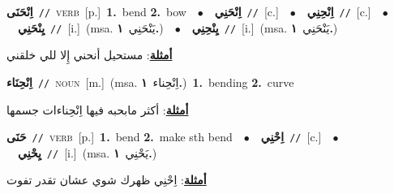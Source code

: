 \documentclass[10pt,a4paper,twoside]{article} %
\begin{document}
\begin{multicols}{2}
{\setlength\topsep{0pt}\textbf{\foreignlanguage{arabic}{اِنْحَنَى}}\ {\color{gray}\texttt{//}\color{black}}\ \textsc{verb}\ [p.]\ \textbf{1.}~bend  \textbf{2.}~bow\ \ $\bullet$\ \ \setlength\topsep{0pt}\textbf{\foreignlanguage{arabic}{اِنْحَنِي}}\ {\color{gray}\texttt{//}\color{black}}\ [c.]\ \ $\bullet$\ \ \setlength\topsep{0pt}\textbf{\foreignlanguage{arabic}{اِنْحِنِي}}\ {\color{gray}\texttt{//}\color{black}}\ [c.]\ \ $\bullet$\ \ \setlength\topsep{0pt}\textbf{\foreignlanguage{arabic}{يِنْحَنِي}}\ {\color{gray}\texttt{//}\color{black}}\ [i.]\ \color{gray}(msa. \foreignlanguage{arabic}{يَنْحَنِي}~\foreignlanguage{arabic}{\textbf{١.}})\color{black}\ \ $\bullet$\ \ \setlength\topsep{0pt}\textbf{\foreignlanguage{arabic}{يِنْحِنِي}}\ {\color{gray}\texttt{//}\color{black}}\ [i.]\ \color{gray}(msa. \foreignlanguage{arabic}{يَنْحَنِي}~\foreignlanguage{arabic}{\textbf{١.}})\color{black}\  \begin{flushright}\color{gray}\foreignlanguage{arabic}{\textbf{\underline{\foreignlanguage{arabic}{أمثلة}}}: مستحيل أنحني إِلا للي خلقني}\end{flushright}\color{black}} \vspace{2mm}

{\setlength\topsep{0pt}\textbf{\foreignlanguage{arabic}{اِنْحِنَاء}}\ {\color{gray}\texttt{//}\color{black}}\ \textsc{noun}\ [m.]\ \color{gray}(msa. \foreignlanguage{arabic}{اِنْحِناء}~\foreignlanguage{arabic}{\textbf{١.}})\color{black}\ \textbf{1.}~bending  \textbf{2.}~curve\  \begin{flushright}\color{gray}\foreignlanguage{arabic}{\textbf{\underline{\foreignlanguage{arabic}{أمثلة}}}: أكثر مابحبه فيها اِنْحِناءات جسمها}\end{flushright}\color{black}} \vspace{2mm}

{\setlength\topsep{0pt}\textbf{\foreignlanguage{arabic}{حَنَى}}\ {\color{gray}\texttt{//}\color{black}}\ \textsc{verb}\ [p.]\ \textbf{1.}~bend  \textbf{2.}~make sth bend\ \ $\bullet$\ \ \setlength\topsep{0pt}\textbf{\foreignlanguage{arabic}{اِحْنِي}}\ {\color{gray}\texttt{//}\color{black}}\ [c.]\ \ $\bullet$\ \ \setlength\topsep{0pt}\textbf{\foreignlanguage{arabic}{يِحْنِي}}\ {\color{gray}\texttt{//}\color{black}}\ [i.]\ \color{gray}(msa. \foreignlanguage{arabic}{يَحْنِي}~\foreignlanguage{arabic}{\textbf{١.}})\color{black}\  \begin{flushright}\color{gray}\foreignlanguage{arabic}{\textbf{\underline{\foreignlanguage{arabic}{أمثلة}}}: اِحْنِي ظهرك شوي عشان تقدر تفوت}\end{flushright}\color{black}} \vspace{2mm}


\end{multicols}
\end{document}
